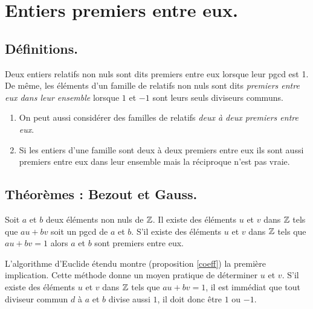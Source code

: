 \section{Entiers premiers entre eux.}
\subsection{Définitions.}
\begin{defi}
 Deux entiers relatifs non nuls sont dits premiers entre eux lorsque leur pgcd est 1. De même, les éléments d'un famille de relatifs non nuls sont dits \emph{ premiers entre eux dans leur ensemble}  lorsque $1$ et $-1$ sont leurs seuls diviseurs communs.
\end{defi}
\begin{rems}
\begin{enumerate}
 \item On peut aussi considérer des familles de relatifs \emph{deux à deux premiers entre eux}.
 \item Si les entiers d'une famille sont deux à deux premiers entre eux ils sont aussi premiers entre eux dans leur ensemble mais la réciproque n'est pas vraie.
\end{enumerate}
 \end{rems}

\subsection{Théorèmes : Bezout et Gauss.}
\begin{thm}[de Bezout]
 Soit $a$ et $b$ deux éléments non nuls de $\mathbb{Z}$.\newline
Il existe des éléments $u$ et $v$ dans $\mathbb{Z}$ tels que $au+bv$ soit un pgcd de $a$ et $b$. S'il existe des éléments $u$ et $v$ dans $\mathbb{Z}$ tels que $au+bv=1$ alors $a$ et $b$ sont premiers entre eux.
\end{thm}
\begin{demo}
 L'algorithme d'Euclide étendu montre (proposition \ref{coeff}) la première implication. Cette méthode donne un moyen pratique de déterminer $u$ et $v$.\newline
 S'il existe des éléments $u$ et $v$ dans $\mathbb{Z}$ tels que $au+bv=1$, il est immédiat que tout diviseur commun $d$ à $a$ et $b$ divise aussi $1$, il doit donc être $1$ ou $-1$.
\end{demo}

